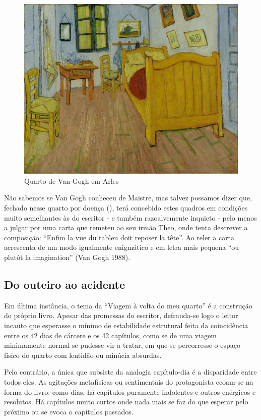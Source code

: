 \documentclass[12pt]{article}
\begin{document}
\begin{figure}
  \label{fig:1}
  \centering\includegraphics[height=0.6\textheight,keepaspectratio] {slaapkamer.jpg}
  \caption{Quarto de Van Gogh em Arles}
\end{figure}

Não sabemos se Van Gogh conheceu de Maistre, mas talvez possamos dizer
que, fechado nesse quarto por doença (\cite{goghroom}), terá concebido
estes quadros em condições muito semelhantes às do escritor - e também
razoalvemente inquieto - pelo menos a julgar por uma carta que remeteu
ao seu irmão Theo, onde tenta descrever a composição: ``Enfim la vue
du tableu doit reposer la tête''. Ao reler a carta acrescenta de um
modo igualmente enigmático e em letra mais pequena ``ou plutôt la
imagination'' (Van Gogh 1988).

\subsection{Do outeiro ao acidente}

Em última instância, o tema da ``Viagem à volta do meu quarto'' é a
construção do próprio livro. Apesar das promessas do escritor,
defrauda-se logo o leitor incauto que esperasse o mínimo de
estabilidade estrutural feita da coincidência entre os 42 dias de
cárcere e os 42 capítulos, como se de uma viagem minimamente normal se
pudesse vir a tratar, em que se percorresse o espaço físico do quarto
com lentidão ou minúcia absurdas.

Pelo contrário, a única que subsiste da analogia capítulo-dia é a
disparidade entre todos eles. As agitações metafísicas ou sentimentais
do protagonista ecoam-se na forma do livro: como dias, há capítulos
puramente indolentes e outros enérgicos e resolutos. Há capítulos
muito curtos onde nada mais se faz do que esperar pelo próximo ou se
evoca o capítulos passados.
\end{document}
